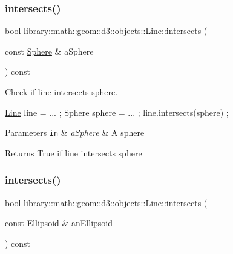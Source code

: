 \subsubsection{\texorpdfstring{intersects()}{intersects()}\hspace{0.1cm}{\footnotesize\ttfamily [3/4]}}
{\footnotesize\ttfamily bool library\+::math\+::geom\+::d3\+::objects\+::\+Line\+::intersects (\begin{DoxyParamCaption}\item[{const \hyperlink{classlibrary_1_1math_1_1geom_1_1d3_1_1objects_1_1_sphere}{Sphere} \&}]{a\+Sphere }\end{DoxyParamCaption}) const}



Check if line intersects sphere. 


\begin{DoxyCode}
\hyperlink{classlibrary_1_1math_1_1geom_1_1d3_1_1objects_1_1_line_a762e529453ff9ffa9233fd73737f4692}{Line} line = ... ;
Sphere sphere = ... ;
line.intersects(sphere) ;
\end{DoxyCode}



\begin{DoxyParams}[1]{Parameters}
\mbox{\tt in}  & {\em a\+Sphere} & A sphere \\
\hline
\end{DoxyParams}
\begin{DoxyReturn}{Returns}
True if line intersects sphere 
\end{DoxyReturn}
\mbox{\label{classlibrary_1_1math_1_1geom_1_1d3_1_1objects_1_1_line_a2cc1edf1b60745c518fbf19f2ab0771c}} 
\subsubsection{\texorpdfstring{intersects()}{intersects()}\hspace{0.1cm}{\footnotesize\ttfamily [4/4]}}
{\footnotesize\ttfamily bool library\+::math\+::geom\+::d3\+::objects\+::\+Line\+::intersects (\begin{DoxyParamCaption}\item[{const \hyperlink{classlibrary_1_1math_1_1geom_1_1d3_1_1objects_1_1_ellipsoid}{Ellipsoid} \&}]{an\+Ellipsoid }\end{DoxyParamCaption}) const}



